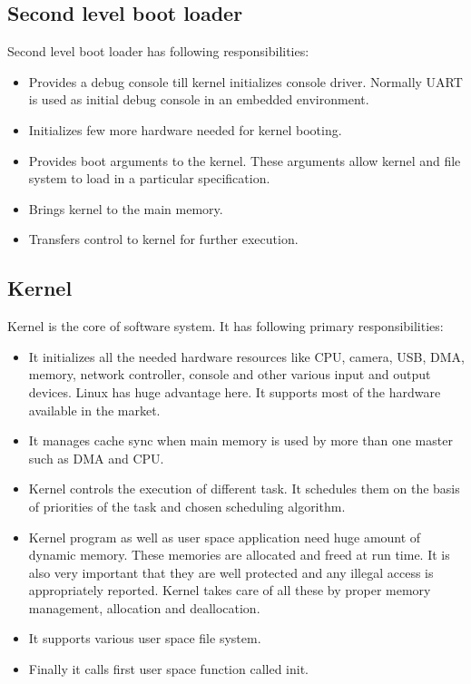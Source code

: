 \subsection {Second level boot loader}
\indent Second level boot loader has following responsibilities:
\begin{itemize}
 \item Provides a debug console till kernel initializes
 console driver. Normally UART is used as initial debug
 console in an embedded environment.
 \item Initializes few more hardware needed for kernel booting.
 \item Provides boot arguments to the kernel. These arguments
 allow kernel and file system to load in a particular
 specification.
 \item Brings kernel to the main memory.
 \item Transfers control to kernel for further execution.
\end{itemize}
\subsection {Kernel}
\indent Kernel is the core of software system. It has following primary
responsibilities:
\begin{itemize}
 \item It initializes all the needed hardware resources like
 CPU, camera, USB, DMA, memory, network controller,
 console and other various input and output devices.
 Linux has huge advantage here. It supports most of the
 hardware available in the market.
 \item It manages cache sync when main memory is used by more
 than one master such as DMA and CPU.
 \item Kernel controls the execution of different task. It
 schedules them on the basis of priorities of the task
 and chosen scheduling algorithm.
 \item Kernel program as well as user space application need huge
 amount of dynamic memory. These memories are allocated
 and freed at run time. It is also very important that
 they are well protected and any illegal access is
 appropriately reported. Kernel takes care of all these
 by proper memory management, allocation and
 deallocation.
 \item It supports various user space file system.
 \item Finally it calls first user space function called init.
\end{itemize}
